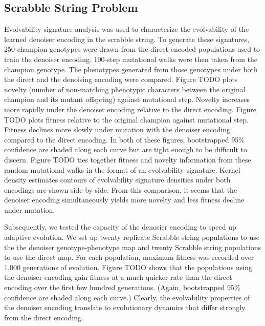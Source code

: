 \subsection{Scrabble String Problem}

Evolvability signature analysis was used to characterize the evolvability of the learned denoiser encoding in the scrabble string.
To generate these signatures, 250 champion genotypes were drawn from the direct-encoded populations used to train the denoiser encoding.
100-step mutational walks were then taken from the champion genotype.
The phenotypes generated from those genotypes under both the direct and the denoising encoding were compared.
Figure TODO plots novelty (number of non-matching phenotypic characters between the original champion and its mutant offspring) against mutational step.
Novelty increases more rapidly under the denoiser encoding relative to the direct encoding.
Figure TODO plots fitness relative to the original champion against mutational step.
Fitness declines more slowly under mutation with the denoiser encoding compared to the direct encoding.
In both of these figures, bootstrapped 95\% confidence are shaded along each curve but are tight enough to be difficult to discern.
Figure TODO ties together fitness and novelty information from these random mutational walks in the format of an evolvability signature.
Kernel density estimates contours of evolvability signature densities under both encodings are shown side-by-side.
From this comparison, it seems that the denoiser encoding simultaneously yields more novelty and less fitness decline under mutation.

Subsequently, we tested the capacity of the denosier encoding to speed up adaptive evolution.
We set up twenty replicate Scrabble string populations to use the the denoiser genotype-phenotype map and twenty Scrabble string populations to use the direct map.
For each population, maximum fitness was recorded over 1,000 generations of evolution.
Figure TODO shows that the populations using the denoiser encoding gain fitness at a much quicker rate than the direct encoding over the first few hundred generations.
(Again, bootstrapped 95\% confidence are shaded along each curve.)
Clearly, the evolvability properties of the denoiser encoding translate to evolutionary dynamics that differ strongly from the direct encoding.

